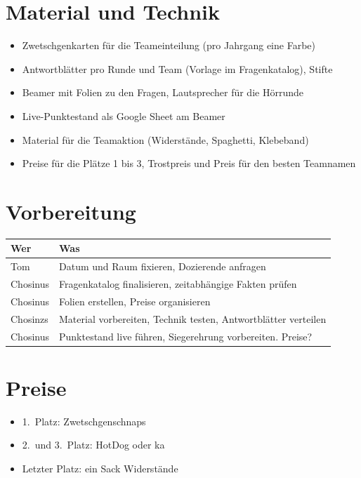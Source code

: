 \documentclass[a4paper,11pt]{article}
\begin{document}
\section{Material und Technik}
\begin{itemize}
  \item Zwetschgenkarten für die Teameinteilung (pro Jahrgang eine Farbe)
  \item Antwortblätter pro Runde und Team (Vorlage im Fragenkatalog), Stifte
  \item Beamer mit Folien zu den Fragen, Lautsprecher für die Hörrunde
  \item Live-Punktestand als Google Sheet am Beamer
  \item Material für die Teamaktion (Widerstände, Spaghetti, Klebeband)
  \item Preise für die Plätze 1 bis 3, Trostpreis und Preis für den besten Teamnamen
\end{itemize}

\section{Vorbereitung}
\begin{tabularx}{\textwidth}{@{}l X@{}}
\toprule
\textbf{Wer} & \textbf{Was} \\
\midrule
Tom & Datum und Raum fixieren, Dozierende anfragen \\
Chosinus & Fragenkatalog finalisieren, zeitabhängige Fakten prüfen \\
Chosinus & Folien erstellen, Preise organisieren \\
Chosinzs & Material vorbereiten, Technik testen, Antwortblätter verteilen \\
Chosinus & Punktestand live führen, Siegerehrung vorbereiten. Preise? \\
\bottomrule
\end{tabularx}

\section{Preise }
\begin{itemize}
  \item 1.\ Platz: Zwetschgenschnaps
  \item 2.\ und 3.\ Platz: HotDog oder ka
  \item Letzter Platz: ein Sack Widerstände
\end{itemize}
\end{document}

